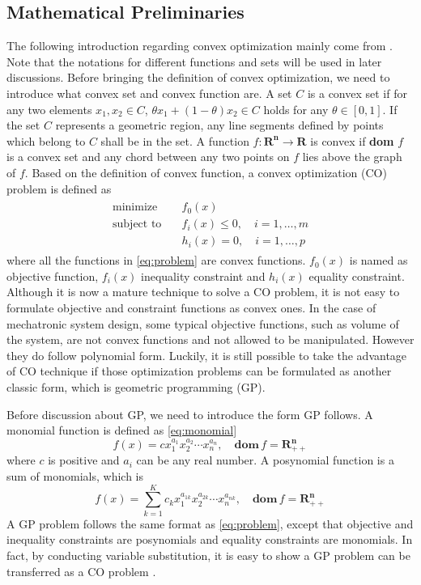 \subsection{Mathematical Preliminaries}
The following introduction regarding convex optimization mainly come from \cite{boyd2004convex}. Note that the notations for different functions and sets will be used in later discussions. Before bringing the definition of convex optimization, we need to introduce what convex set and convex function are. A set $C$ is a convex set if for any two elements $x_1, x_2 \in C$, $\theta x_1+(1-\theta) x_2\in C$ holds for any $\theta \in \left[0,1\right]$. If the set $C$ represents a geometric region, any line segments defined by points which belong to $C$ shall be in the set. A function $f : \mathbf{R^n} \to \mathbf{R}$ is convex if \textbf{dom} $f$ is a convex set and any chord between any two points on $f$ lies above the graph of $f$. Based on the definition of convex function, a convex optimization (CO) problem is defined as 
\begin{align}
\begin{split}
\label{eq:problem}
\text{minimize} \quad  & f_0(x) \\
\text{subject to} \quad & f_i(x) \leq 0,\quad i=1,\ldots,m\\
                  & h_i(x) = 0,\quad i=1,\ldots,p
\end{split}
\end{align}
where all the functions in \ref{eq:problem} are convex functions. $f_0(x)$ is named as objective function, $f_i(x)$ inequality constraint and $h_i(x)$ equality constraint. Although it is now a mature technique to solve a CO problem, it is not easy to formulate objective and constraint functions as convex ones. In the case of mechatronic system design, some typical objective functions, such as volume of the system, are not convex functions and not allowed to be manipulated. However they do follow polynomial form. Luckily, it is still possible to take the advantage of CO technique if those optimization problems can be formulated as another classic form, which is geometric programming (GP).

Before discussion about GP, we need to introduce the form GP follows. A monomial function is defined as \ref{eq:monomial}
\begin{equation}
\label{eq:monomial}
f(x)=cx_1^{a_1}x_2^{a_2}\cdots x_n^{a_n}, \quad \mathbf{dom} \, f=\mathbf{R_{++}^n}
\end{equation}
where $c$ is positive and $a_i$ can be any real number. A posynomial function is a sum of monomials, which is 
\begin{equation}
\label{eq:posynomial}
f(x)=\sum_{k=1}^K c_kx_1^{a_{1k}}x_2^{a_{2k}}\cdots x_n^{a_{nk}}, \quad \mathbf{dom} \, f=\mathbf{R_{++}^n}
\end{equation}
A GP problem follows the same format as \ref{eq:problem}, except that objective and inequality constraints are posynomials and equality constraints are monomials. In fact, by conducting variable substitution, it is easy to show a GP problem can be transferred as a CO problem \cite{boyd2004convex}. 

